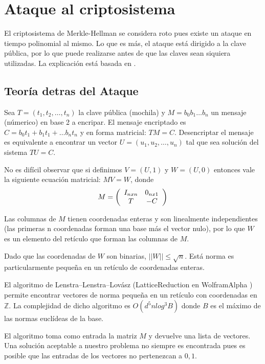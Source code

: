 \documentclass[12pt]{article}
\begin{document}
\section{Ataque al criptosistema}

El criptosistema de Merkle-Hellman se considera roto pues existe un ataque en tiempo polinomial al mismo. Lo que es más, el ataque está dirigido a la clave pública, por lo que puede realizarse antes de que las claves sean siquiera utilizadas. La explicación está basada en \cite{stamplattice}.

\subsection{Teoría detras del Ataque}

Sea $T = (t_1,t_2,\dots,t_n)$ la clave pública (mochila) y $M = b_0b_1\dots b_n$ un mensaje (númerico) en base 2 a encripar. El mensaje encriptado es $C = b_0t_1 + b_1t_1 + \dots b_nt_n$ y en forma matricial: $TM = C$. Desencriptar el mensaje es equivalente a encontrar un vector $U = (u_1,u_2,\dots, u_n)$ tal que sea solución del sistema $TU = C$.

No es difícil observar que si definimos $V = (U,1)$ y $W = (U,0)$ entonces vale la siguiente ecuación matricial: $MV = W$, donde 
$$M = \left(\begin{array}{c c}
I_{nxn} & 0_{nx1} \\ T & -C
\end{array}\right)$$

Las columnas de $M$ tienen coordenadas enteras y son linealmente independientes (las primeras n coordenadas forman una base más el vector nulo), por lo que $W$ es un elemento del retículo que forman las columnas de $M$. 

Dado que las coordenadas de $W$ son binarias, $||W|| \leq \sqrt{n}$. Está norma es particularmente pequeña en un retículo de coordenadas enteras. 

El algoritmo de Lenstra–Lenstra–Lovász (LatticeReduction en WolframAlpha \cite{weisstein2010lattice}) permite encontrar vectores de norma pequeña en un retículo con coordenadas en $\mathbb{Z}$. La complejidad de dicho algoritmo es $O(d^5 n log^3 B)$ donde $B$ es el máximo de las normas euclídeas de la base.

El algoritmo toma como entrada la matriz $M$ y devuelve una lista de vectores. Una solución aceptable a nuestro problema no siempre es encontrada pues es posible que las entradas de los vectores no pertenezcan a ${0,1}$.
\end{document}
